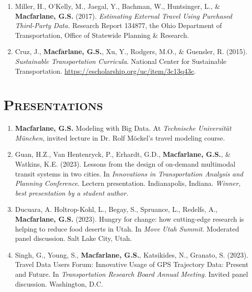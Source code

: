 \documentclass[margin,line]{res}
\newif\ifdetail
\newcounter{enuminitialize}
\newenvironment{myenum}[1][]
{%
 \setcounter{enuminitialize}{#1}
 \addtocounter{enuminitialize}{2}
 \begin{enumerate}[left= 4pt, itemsep=12pt, start=\value{enuminitialize}, label=\arabic*\addtocounter{enumi}{-2}]
}
{%
 \end{enumerate}
}
\newcommand{\secfont}{\scshape }
\begin{document}
\begin{resume}
\begin{myenum}[9]
\item Miller, H., O'Kelly, M., Jaegal, Y., Bachman, W., Huntsinger, L., \& \textbf{Macfarlane, G.S.} (2017). \textit{Estimating External Travel Using Purchased Third-Party Data.} Research Report 134877, the Ohio Department of Transportation, Office of Statewide Planning \& Research. \ifdetail Citations: 1  \fi

\item Cruz, J., \textbf{Macfarlane, G.S.}, Xu, Y., Rodgers, M.O., \& Guensler, R. (2015). \textit{Sustainable Transportation Curricula}. National Center for Sustainable Transportation. \url{https://escholarship.org/uc/item/3c13q43c}.
\end{myenum}

\noindent\makebox[\linewidth]{\rule{\linewidth}{0.4pt}}
\section{\secfont Presentations}
\ifdetail This includes invited presentations to academic and non-academic audiences, as
well as presentations resulting from abstract-only submission. Includes both
lectern sessions and posters. Item 1 came from my undergraduate honors thesis, items 2 through 4 from doctoral research,
items 5 through 10 from my work as a consultant, and items 11 through 26 represent work
completed during my time at BYU.\fi
\vspace{0.3cm}
\begin{myenum}[27]
\item \textbf{Macfarlane, G.S.} Modeling with Big Data. At \textit{Technische Universit\"at M\"unchen}, invited lecture in Dr. Rolf M\"ockel's travel modeling course.
\item Guan, H.Z., Van Hentenryck, P., Erhardt, G.D., \textbf{Macfarlane, G.S.}, \& Watkins, K.E. (2023). Lessons from the design of on-demand multimodal transit systems in two cities. In \textit{Innovations in Transportation Analysis and Planning Conference}. Lectern presentation. Indianapolis, Indiana. \textit{Winner, best presentation by a student author.}
\item Ducuara, A. Holtrop-Kohl, L., Begay, S., Spruance, L., Redelfs, A., \textbf{Macfarlane, G.S.} (2023). Hungry for change: how cutting-edge research is helping to reduce food deserts in Utah. In \textit{Move Utah Summit}. Moderated panel discussion. Salt Lake City, Utah.
\item Singh, G., Young, S., \textbf{Macfarlane, G.S.}, Katsikides, N., Granato, S. (2023). Travel Data Users Forum: Innovative Usage of GPS Trajectory Data: Present and Future. In \textit{Transportation Research Board Annual Meeting}. Invited panel discussion. Washington, D.C.

\end{myenum}
\end{resume}
\end{document}

